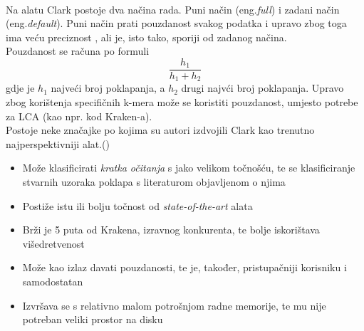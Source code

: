 \documentclass[times, utf8, seminar]{fer}
\begin{document}
\\Na alatu Clark postoje dva načina rada. Puni način (eng.\textit{full}) i zadani način (eng.\textit{default}). Puni način prati pouzdanost svakog podatka i upravo zbog toga ima veću preciznost , ali je, isto tako, sporiji od zadanog načina.
\\Pouzdanost se računa po formuli $$\dfrac{h_{1}}{h_{1}+h_{2}}$$ gdje je $h_{1}$ najveći broj poklapanja, a $h_{2}$ drugi najvći broj poklapanja.
Upravo zbog korištenja specifičnih k-mera može se koristiti pouzdanost, umjesto potrebe za LCA (kao npr. kod Kraken-a).
\\Postoje neke značajke po kojima su autori izdvojili Clark kao trenutno najperspektivniji alat.(\cite{CLARK})
\begin{itemize}
	\item Može klasificirati \textit{kratka očitanja} s jako velikom točnošću, te se klasificiranje stvarnih uzoraka poklapa s literaturom objavljenom o njima
	\item Postiže istu ili bolju točnost od \textit{state-of-the-art} alata
	\item Brži je 5 puta od Krakena, izravnog konkurenta, te bolje iskorištava višedretvenost
	\item Može kao izlaz davati pouzdanosti, te je, također, pristupačniji korisniku i samodostatan
	\item Izvršava se s relativno malom potrošnjom radne memorije, te mu nije potreban veliki prostor na disku 
\end{itemize}
\end{document}
